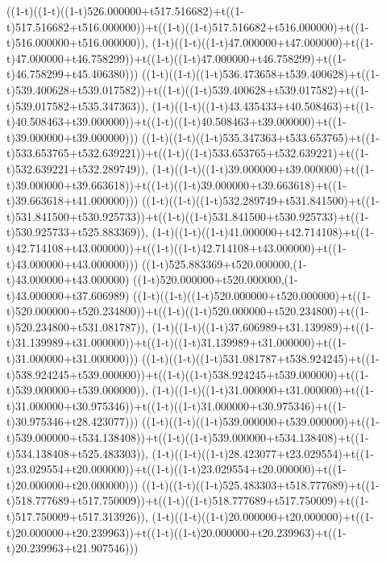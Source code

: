 ((1-t)((1-t)((1-t)526.000000+t517.516682)+t((1-t)517.516682+t516.000000))+t((1-t)((1-t)517.516682+t516.000000)+t((1-t)516.000000+t516.000000)),                                     (1-t)((1-t)((1-t)47.000000+t47.000000)+t((1-t)47.000000+t46.758299))+t((1-t)((1-t)47.000000+t46.758299)+t((1-t)46.758299+t45.406380)))
((1-t)((1-t)((1-t)536.473658+t539.400628)+t((1-t)539.400628+t539.017582))+t((1-t)((1-t)539.400628+t539.017582)+t((1-t)539.017582+t535.347363)),                                     (1-t)((1-t)((1-t)43.435433+t40.508463)+t((1-t)40.508463+t39.000000))+t((1-t)((1-t)40.508463+t39.000000)+t((1-t)39.000000+t39.000000)))
((1-t)((1-t)((1-t)535.347363+t533.653765)+t((1-t)533.653765+t532.639221))+t((1-t)((1-t)533.653765+t532.639221)+t((1-t)532.639221+t532.289749)),                                     (1-t)((1-t)((1-t)39.000000+t39.000000)+t((1-t)39.000000+t39.663618))+t((1-t)((1-t)39.000000+t39.663618)+t((1-t)39.663618+t41.000000)))
((1-t)((1-t)((1-t)532.289749+t531.841500)+t((1-t)531.841500+t530.925733))+t((1-t)((1-t)531.841500+t530.925733)+t((1-t)530.925733+t525.883369)),                                     (1-t)((1-t)((1-t)41.000000+t42.714108)+t((1-t)42.714108+t43.000000))+t((1-t)((1-t)42.714108+t43.000000)+t((1-t)43.000000+t43.000000)))
((1-t)525.883369+t520.000000,(1-t)43.000000+t43.000000)
((1-t)520.000000+t520.000000,(1-t)43.000000+t37.606989)
((1-t)((1-t)((1-t)520.000000+t520.000000)+t((1-t)520.000000+t520.234800))+t((1-t)((1-t)520.000000+t520.234800)+t((1-t)520.234800+t531.081787)),                                     (1-t)((1-t)((1-t)37.606989+t31.139989)+t((1-t)31.139989+t31.000000))+t((1-t)((1-t)31.139989+t31.000000)+t((1-t)31.000000+t31.000000)))
((1-t)((1-t)((1-t)531.081787+t538.924245)+t((1-t)538.924245+t539.000000))+t((1-t)((1-t)538.924245+t539.000000)+t((1-t)539.000000+t539.000000)),                                     (1-t)((1-t)((1-t)31.000000+t31.000000)+t((1-t)31.000000+t30.975346))+t((1-t)((1-t)31.000000+t30.975346)+t((1-t)30.975346+t28.423077)))
((1-t)((1-t)((1-t)539.000000+t539.000000)+t((1-t)539.000000+t534.138408))+t((1-t)((1-t)539.000000+t534.138408)+t((1-t)534.138408+t525.483303)),                                     (1-t)((1-t)((1-t)28.423077+t23.029554)+t((1-t)23.029554+t20.000000))+t((1-t)((1-t)23.029554+t20.000000)+t((1-t)20.000000+t20.000000)))
((1-t)((1-t)((1-t)525.483303+t518.777689)+t((1-t)518.777689+t517.750009))+t((1-t)((1-t)518.777689+t517.750009)+t((1-t)517.750009+t517.313926)),                                     (1-t)((1-t)((1-t)20.000000+t20.000000)+t((1-t)20.000000+t20.239963))+t((1-t)((1-t)20.000000+t20.239963)+t((1-t)20.239963+t21.907546)))
